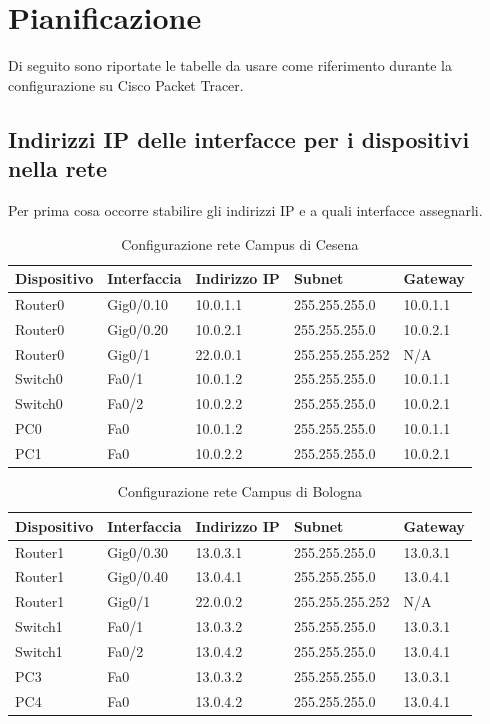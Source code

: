 \documentclass[a4paper,12pt]{report}
\begin{document}
\section{Pianificazione}
Di seguito sono riportate le tabelle da usare come riferimento durante la configurazione su Cisco Packet Tracer.
\subsection{Indirizzi IP delle interfacce per i dispositivi nella rete}
Per prima cosa occorre stabilire gli indirizzi IP e a quali interfacce assegnarli.
\begin{table}[H]
\begin{tabular}{@{}lllll@{}}
\toprule
Dispositivo & Interfaccia & Indirizzo IP & Subnet & Gateway \\ \midrule
Router0 & Gig0/0.10 & 10.0.1.1 & 255.255.255.0 & 10.0.1.1 \\
Router0 & Gig0/0.20 & 10.0.2.1 & 255.255.255.0 & 10.0.2.1 \\
Router0 & Gig0/1 & 22.0.0.1 & 255.255.255.252 & N/A \\
Switch0 & Fa0/1 & 10.0.1.2 & 255.255.255.0 & 10.0.1.1 \\
Switch0 & Fa0/2 & 10.0.2.2 & 255.255.255.0 & 10.0.2.1 \\
PC0 & Fa0 & 10.0.1.2 & 255.255.255.0 & 10.0.1.1 \\
PC1 & Fa0 & 10.0.2.2 & 255.255.255.0 & 10.0.2.1 \\ \bottomrule
\end{tabular}
\caption{Configurazione rete Campus di Cesena}
\label{table:config_cesena}
\end{table}
\begin{table}[H]
\begin{tabular}{lllll}
\hline
Dispositivo & Interfaccia & Indirizzo IP & Subnet & Gateway \\ \hline
Router1 & Gig0/0.30 & 13.0.3.1 & 255.255.255.0 & 13.0.3.1 \\
Router1 & Gig0/0.40 & 13.0.4.1 & 255.255.255.0 & 13.0.4.1 \\
Router1 & Gig0/1 & 22.0.0.2 & 255.255.255.252 & N/A \\
Switch1 & Fa0/1 & 13.0.3.2 & 255.255.255.0 & 13.0.3.1 \\
Switch1 & Fa0/2 & 13.0.4.2 & 255.255.255.0 & 13.0.4.1 \\
PC3 & Fa0 & 13.0.3.2 & 255.255.255.0 & 13.0.3.1 \\
PC4 & Fa0 & 13.0.4.2 & 255.255.255.0 & 13.0.4.1 \\ \hline
\end{tabular}
\caption{Configurazione rete Campus di Bologna}
\label{table:config_bologna}
\end{table}
\end{document}
